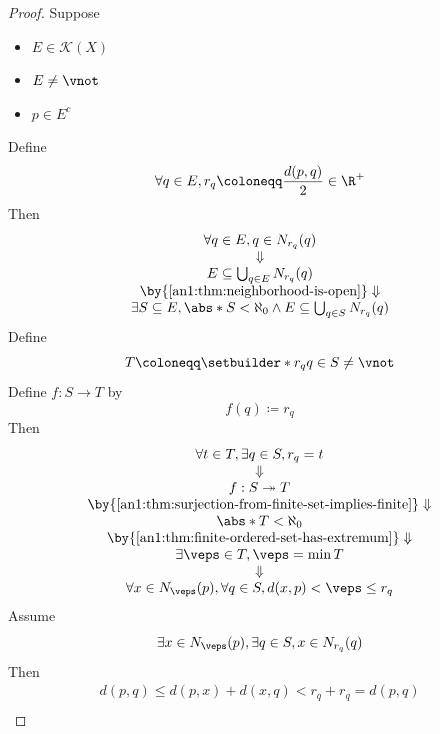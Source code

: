 \begin{proof}
  Suppose
  \begin{itemize}
    \item $E \in \mathcal{K}(X)$
    \item $E \neq \vnot$
    \item $p \in E^{c}$
  \end{itemize}
  Define
  \[
    \forall q \in E, r_{q} \coloneqq \frac{d(p, q)}{2} \in \R^{+}
  \]
  Then
  \[
    \begin{array}{c}
      \forall q \in E, q \in N_{r_{q}}(q)                 \\
      \Downarrow                                          \\
      E \subseteq \bigcup_{q \in E} N_{r_{q}}(q)          \\
      \by{\Cref{an1:thm:neighborhood-is-open}} \Downarrow \\
      \exists S \subseteq E, \abs*{S} < \aleph_{0} \land E \subseteq \bigcup_{q \in S} N_{r_{q}}(q)
    \end{array}
  \]
  Define
  \[
    T \coloneqq \setbuilder*{r_{q}}{q \in S} \neq \vnot
  \]
  Define $f: S \to T$ by
  \[
    f(q) \coloneqq r_{q}
  \]
  Then
  \[
    \begin{array}{c}
      \forall t \in T, \exists q \in S, r_{q} = t                              \\
      \Downarrow                                                               \\
      f: S \twoheadrightarrow T                                                \\
      \by{\Cref{an1:thm:surjection-from-finite-set-implies-finite}} \Downarrow \\
      \abs*{T} < \aleph_{0}                                                    \\
      \by{\Cref{an1:thm:finite-ordered-set-has-extremum}} \Downarrow           \\
      \exists \veps \in T, \veps = \min T                                      \\
      \Downarrow                                                               \\
      \forall x \in N_{\veps}(p), \forall q \in S, d(x, p) < \veps \leq r_{q}
    \end{array}
  \]
  Assume
  \[
    \exists x \in N_{\veps}(p), \exists q \in S, x \in N_{r_{q}}(q)
  \]
  Then
  \[
    \begin{array}{c}
      d(p, q) \leq d(p, x) + d(x, q) < r_{q} + r_{q} = d(p, q) \\

\end{array}\]
\end{proof}
